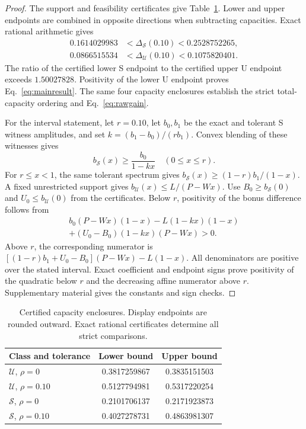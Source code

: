 \documentclass{optica-article}
\begin{document}
\begin{proof}
The support and feasibility certificates give Table~\ref{tab:capacity}. Lower and upper endpoints are combined in opposite directions when subtracting capacities. Exact rational arithmetic gives
\begin{align}
 0.1614029983&<\Delta_{\mathcal S}(0.10)<0.2528752265,\\
 0.0866515534&<\Delta_{\mathcal U}(0.10)<0.1075820401.
 \label{eq:bonusbounds}
\end{align}
The ratio of the certified lower S endpoint to the certified upper U endpoint exceeds $1.50027828$. Positivity of the lower U endpoint proves Eq.~\eqref{eq:mainresult}. The same four capacity enclosures establish the strict total-capacity ordering and Eq.~\eqref{eq:rawgain}.

For the interval statement, let $r=0.10$, let $b_0,b_1$ be the exact and tolerant S witness amplitudes, and set $k=(b_1-b_0)/(rb_1)$. Convex blending of these witnesses gives
\begin{equation}
 b_{\mathcal S}(x)\geq\frac{b_0}{1-kx}\quad(0\leq x\leq r).
 \label{eq:blend}
\end{equation}
For $r\leq x<1$, the same tolerant spectrum gives $b_{\mathcal S}(x)\geq(1-r)b_1/(1-x)$. A fixed unrestricted support gives $b_{\mathcal U}(x)\leq L/(P-Wx)$. Use $B_0\geq b_{\mathcal S}(0)$ and $U_0\leq b_{\mathcal U}(0)$ from the certificates. Below $r$, positivity of the bonus difference follows from
\begin{multline}
 b_0(P-Wx)(1-x)-L(1-kx)(1-x)\\
 +(U_0-B_0)(1-kx)(P-Wx)>0.
 \label{eq:intervalpolynomial}
\end{multline}
Above $r$, the corresponding numerator is $[(1-r)b_1+U_0-B_0](P-Wx)-L(1-x)$. All denominators are positive over the stated interval. Exact coefficient and endpoint signs prove positivity of the quadratic below $r$ and the decreasing affine numerator above $r$. Supplementary material gives the constants and sign checks.
\end{proof}

\begin{table}[htbp]
\centering
\renewcommand{\arraystretch}{1.15}
\caption{Certified capacity enclosures. Display endpoints are rounded outward. Exact rational certificates determine all strict comparisons.}
\label{tab:capacity}
\begin{tabular}{lcc}
\toprule
Class and tolerance & Lower bound & Upper bound\\
\midrule
$\mathcal U$, $\rho=0$ & 0.3817259867 & 0.3835151503\\
$\mathcal U$, $\rho=0.10$ & 0.5127794981 & 0.5317220254\\
$\mathcal S$, $\rho=0$ & 0.2101706137 & 0.2171923873\\
$\mathcal S$, $\rho=0.10$ & 0.4027278731 & 0.4863981307\\
\bottomrule
\end{tabular}
\end{table}
\end{document}

